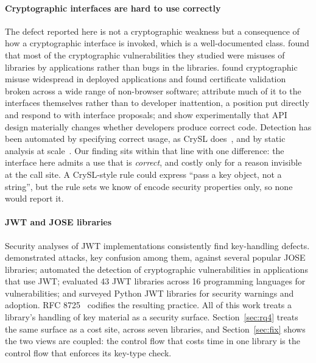 \documentclass[preprint,12pt,authoryear]{elsarticle}
\begin{document}
\paragraph{Cryptographic interfaces are hard to use correctly} The defect
reported here is not a cryptographic weakness but a consequence of how a
cryptographic interface is invoked, which is a well-documented class. \citet{lazar2014why} found that most of the cryptographic vulnerabilities
they studied were misuses of libraries by applications rather than bugs in the
libraries. \citet{egele2013empirical} found cryptographic misuse
widespread in deployed applications and \citet{georgiev2012dangerous} found certificate validation broken across a
wide range of non-browser software; \citet{nadi2016jumping}
attribute much of it to the interfaces themselves rather than to developer
inattention, a position \citet{green2016developers} put directly
and \citet{indela2016helping} respond to with interface proposals;
and \citet{acar2017comparing} show experimentally that API design
materially changes whether developers produce correct code. Detection has been
automated by specifying correct usage, as CrySL does~\citep{kruger2018crysl},
and by static analysis at scale~\citep{rahaman2019cryptoguard}. Our finding sits
within that line with one difference: the interface here admits a use that is
\emph{correct}, and costly only for a reason invisible at the call site. A
CrySL-style rule could express ``pass a key object, not a string'', but the
rule sets we know of encode security properties only, so none would report it.

\paragraph{JWT and JOSE libraries} Security analyses of JWT implementations
consistently find key-handling defects. \citet{detering2017jose} demonstrated attacks, key confusion among them,
against several popular JOSE libraries; \citet{xu2023jwtkey}
automated the detection of cryptographic vulnerabilities in applications that
use JWT; \citet{yang2026tokentimebomb} evaluated 43 JWT libraries
across 16 programming languages for vulnerabilities; and \citet{shatnawi2024python} surveyed Python JWT libraries for security
warnings and adoption. RFC 8725~\citep{rfc8725} codifies the resulting practice.
All of this work treats a library's handling of key material as a security
surface. Section~\ref{sec:rq4} treats the same surface as a cost site, across
seven libraries, and Section~\ref{sec:fix} shows the two views are coupled: the
control flow that costs time in one library is the control flow that enforces
its key-type check.
\end{document}
